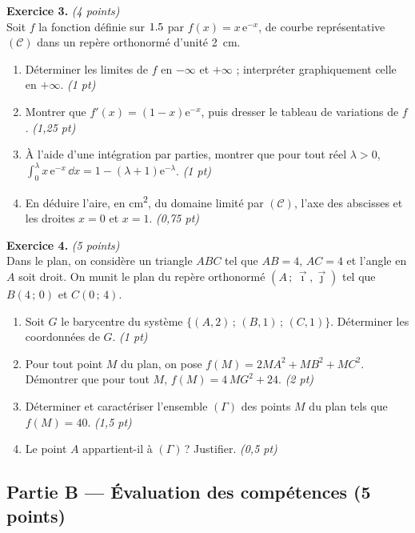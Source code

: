 \smallskip
\noindent\textbf{Exercice 3.} \hfill\textit{(4 points)}\\
Soit $f$ la fonction définie sur $1.5$ par $f(x)=x\,\mathrm{e}^{-x}$, de courbe
représentative $(\mathcal{C})$ dans un repère orthonormé d'unité \SI{2}{\centi\metre}.
\begin{enumerate}[label=\arabic*)]
\item Déterminer les limites de $f$ en $-\infty$ et $+\infty$ ; interpréter graphiquement celle en $+\infty$. \hfill\textit{(1 pt)}
\item Montrer que $f'(x)=(1-x)\mathrm{e}^{-x}$, puis dresser le tableau de variations de $f$. \hfill\textit{(1,25 pt)}
\item À l'aide d'une intégration par parties, montrer que pour tout réel $\lambda>0$,
$\displaystyle\int_0^{\lambda}x\,\mathrm{e}^{-x}\,\dd x=1-(\lambda+1)\mathrm{e}^{-\lambda}$. \hfill\textit{(1 pt)}
\item En déduire l'aire, en \si{\centi\metre\squared}, du domaine limité par $(\mathcal{C})$,
l'axe des abscisses et les droites $x=0$ et $x=1$. \hfill\textit{(0,75 pt)}
\end{enumerate}

\smallskip
\noindent\textbf{Exercice 4.} \hfill\textit{(5 points)}\\
Dans le plan, on considère un triangle $ABC$ tel que $AB=4$, $AC=4$ et l'angle en $A$ soit
droit. On munit le plan du repère orthonormé $(A\,;\,\vec\imath,\vec\jmath)$ tel que
$B(4\,;\,0)$ et $C(0\,;\,4)$.
\begin{enumerate}[label=\arabic*)]
\item Soit $G$ le barycentre du système $\{(A,2)\,;\,(B,1)\,;\,(C,1)\}$. Déterminer les
coordonnées de $G$. \hfill\textit{(1 pt)}
\item Pour tout point $M$ du plan, on pose $f(M)=2MA^2+MB^2+MC^2$. Démontrer que pour tout
$M$, $f(M)=4\,MG^2+24$. \hfill\textit{(2 pt)}
\item Déterminer et caractériser l'ensemble $(\Gamma)$ des points $M$ du plan tels que
$f(M)=40$. \hfill\textit{(1,5 pt)}
\item Le point $A$ appartient-il à $(\Gamma)$\,? Justifier. \hfill\textit{(0,5 pt)}
\end{enumerate}

\subsection*{Partie B — Évaluation des compétences \hfill (5 points)}

